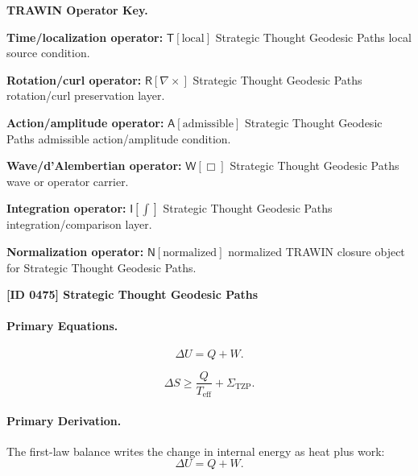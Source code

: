 \par\vspace{0.45\baselineskip}
\noindent\begin{minipage}[t]{\linewidth}
\begingroup
\small
\raggedright
\textbf{TRAWIN Operator Key.}\par
\noindent\textbf{Time/localization operator:} $\mathsf{T}\!\left[\mathrm{local}\right]$ Strategic Thought Geodesic Paths local source condition.\par
\noindent\textbf{Rotation/curl operator:} $\mathsf{R}\!\left[\nabla\times\right]$ Strategic Thought Geodesic Paths rotation/curl preservation layer.\par
\noindent\textbf{Action/amplitude operator:} $\mathsf{A}\!\left[\mathrm{admissible}\right]$ Strategic Thought Geodesic Paths admissible action/amplitude condition.\par
\noindent\textbf{Wave/d'Alembertian operator:} $\mathsf{W}\!\left[\Box\right]$ Strategic Thought Geodesic Paths wave or operator carrier.\par
\noindent\textbf{Integration operator:} $\mathsf{I}\!\left[\int\right]$ Strategic Thought Geodesic Paths integration/comparison layer.\par
\noindent\textbf{Normalization operator:} $\mathsf{N}\!\left[\mathrm{normalized}\right]$ normalized TRAWIN closure object for Strategic Thought Geodesic Paths.\par
\endgroup
\end{minipage}

\clearpage
\noindent\textbf{[ID 0475] Strategic Thought Geodesic Paths}\par
\vspace{0.35em}
\paragraph{Primary Equations.}
\begin{equation}
\Delta U = Q+W .
\end{equation}

\begin{equation}
\Delta S
\geq
\frac{Q}{T_{\mathrm{eff}}}
+
\Sigma_{\mathrm{TZP}} .
\end{equation}

\paragraph{Primary Derivation.}
The first-law balance writes the change in internal energy as heat plus work:
\begin{equation}
\Delta U=Q+W .
\end{equation}

